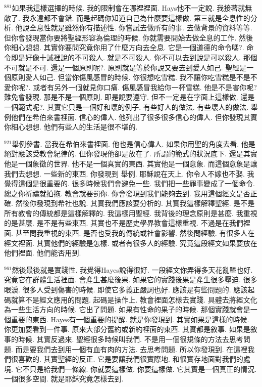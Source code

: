 \documentclass{book}
\begin{document}
$^{881}$如果我這樣選擇的時候.
我的限制會在哪裡裡面.
Hays他不一定說.
我接著就無敵了.
我永遠都不會錯.
而是起碼你知道自己為什麼要這樣做.
第三就是全息性的分析.
他說全息性就是雖然你有描述性.
你嘗試去做所有的事.
去做背景的資料等等.
但你會發現當你要將聖經形容為倫理的時候.
你就需要開始去做全息的工作.
然後你細心想想.
其實你要問究竟你用了什麼方向去全息.
它是一個道德的命令嗎?.
命令即是好像十誡裡說的不可殺人.
就是不可殺人.
你不可以去到說是可以殺人.
那個不可就是不可.
還是一個原則呢?.
原則就是等於你說又要去到愛人如己.
聖經是一個原則愛人如己.
但當你傷風感冒的時候.
你很想吃雪糕.
我不讓你吃雪糕是不是不愛你呢?.
或者有另外一個就見你口痛.
傷風感冒我給你一杯雪糕.
他是不是害你呢?難免會發現.
那是不是一個原則.
即是說要遵守.
但不一定是在字面上這樣做.
還是一個範式呢?.
其實它只是一個好和壞的例子.
有些好人的做法.
有些壞人的做法.
舉例他們在希伯來書裡面.
信心的偉人.
他列出了很多很多信心的偉人.
但你發現其實你細心想想.
他們有些人的生活是很不堪的.

$^{921}$舉例參書.
當我在希伯來書裡面.
他也是信心偉人.
如果你用聖的角度去看.
他是絕對應該受教會紀律的.
但你發現他卻是放在了.
所謂的範式的狀況底下.
還是其實他是一個象徵的世界.
他不是一個真實的東西.
其實他是一個意象.
而這個意象是讓我們去想想.
一些新的東西.
你發現到 舉例.
耶穌說在天上.
你令人不嫁也不娶.
我覺得這個是很重要的.
很多時候我們會避免一些.
我們把一些罪事變成了一個命令.
總之你祈禱就拍拖.
教會就要罰你.
你會發現到我們能夠去到.
我用這個經文是否正確.
然後你發現到希社也說.
其實我們應該要分析的.
其實我這樣解釋聖經.
是不是所有教會的傳統都是這樣解釋的.
我這樣用聖經.
我背後的理念原則是甚麼.
我重視的是甚麼.
是不是有些東西.
其實也不是歷史學界教會這樣重視.
不過是在我們裡面.
甚至問我重視的東西.
是否也受我的傳統或社會影響.
然後問經驗.
有很多人在經文裡面.
其實他們的經驗是怎樣.
或者有很多人的經驗.
究竟這段經文如果要放在他們裡面.
他們能否用到.

$^{961}$然後最後就是實踐性.
我覺得Hayes說得很好.
一段經文你弄得多天花亂墜也好.
究竟它在群體生活裡面.
會產生甚麼後果.
如果它的實踐後果是產生很多壓迫.
很多眼淚.
很多人受到傷害的時候.
即使它多義正嚴詞也好.
應該是有些問題的.
應該起碼就算不是經文應用的問題.
起碼是操作上.
教會裡面怎樣去實踐.
具體去將經文化為一些生活方向的時候.
它出了問題.
如果有性命的果子的時候.
那個實踐就會是一個重要的東西.
Hayes有一個重要的提醒.
就是你發現到.
其實如果是這樣的時候.
你更加要看到一件事.
原來大部分舊約或新約裡面的東西.
其實都是敘事.
如果是敘事的時候.
其實反過來.
聖經很多時候叫我們.
不是用一個很規條的方法去思考問題.
而是要我們去到用一個有血有肉的方法.
去思考問題.
所以你發現到.
在這裡我們很喜歡的.
其實聖經的反正.
它是要讓我們很實際地.
和很實存地面對我們的處境.
它不只是給我們一條線.
你就要這樣做.
你要這樣做.
它其實是一個真正的情況.
一個很多空間.
就是耶穌究竟怎樣去到.
\end{document}
